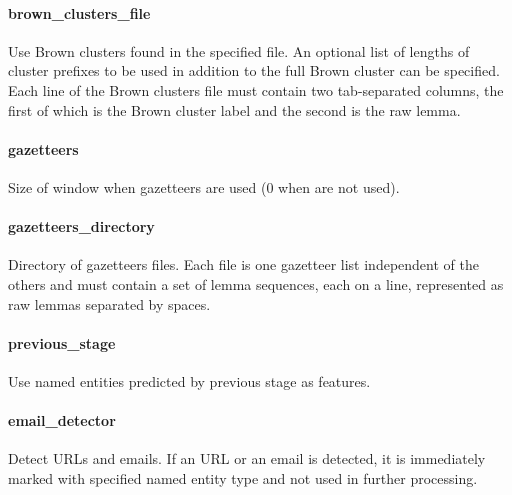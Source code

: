 \paragraph{brown\_clusters\_file}
Use Brown clusters found in the specified file. An optional list of lengths of
cluster prefixes to be used in addition to the full Brown cluster can be specified.
Each line of the Brown clusters file must contain two tab-separated columns,
the first of which is the Brown cluster label and the second is the raw lemma.

\paragraph{gazetteers}
Size of window when gazetteers are used (0 when are not used).

\paragraph{gazetteers\_directory}
Directory of gazetteers files. Each file is one gazetteer list independent
of the others and must contain a set of lemma sequences, each on a line,
represented as raw lemmas separated by spaces.

\paragraph{previous\_stage}
Use named entities predicted by previous stage as features.

\paragraph{email\_detector}
Detect URLs and emails. If an URL or an email is detected, it is immediately marked
with specified named entity type and not used in further processing.

